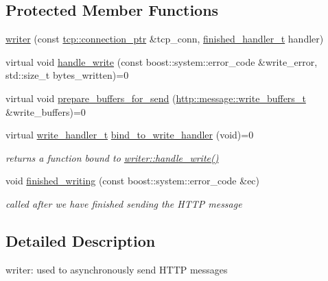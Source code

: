 \subsection*{Protected Member Functions}
\begin{DoxyCompactItemize}
\item 
\hyperlink{classpion_1_1http_1_1writer_abfa160a7e4fbbe09db12ab5c68d886ae}{writer} (const \hyperlink{namespacepion_1_1tcp_a6c9b7497068009f6d81d95ec0b0627d6}{tcp\-::connection\-\_\-ptr} \&tcp\-\_\-conn, \hyperlink{classpion_1_1http_1_1writer_a7e3ce4b88e0427adf673a99fca3af982}{finished\-\_\-handler\-\_\-t} handler)
\item 
virtual void \hyperlink{classpion_1_1http_1_1writer_a8bf871122153a6048ca5b21cacf5310c}{handle\-\_\-write} (const boost\-::system\-::error\-\_\-code \&write\-\_\-error, std\-::size\-\_\-t bytes\-\_\-written)=0
\item 
virtual void \hyperlink{classpion_1_1http_1_1writer_ab7a583948d97402772dc1fe2e87bcf66}{prepare\-\_\-buffers\-\_\-for\-\_\-send} (\hyperlink{classpion_1_1http_1_1message_aacf9a6a7677c32e4ab764ac97d0b5e7b}{http\-::message\-::write\-\_\-buffers\-\_\-t} \&write\-\_\-buffers)=0
\item 
virtual \hyperlink{classpion_1_1http_1_1writer_a36fa31c850362d907559a0c1157a1bf3}{write\-\_\-handler\-\_\-t} \hyperlink{classpion_1_1http_1_1writer_acea77b1d3cd2af31f4f1f410900aa207}{bind\-\_\-to\-\_\-write\-\_\-handler} (void)=0
\begin{DoxyCompactList}\small\item\em returns a function bound to \hyperlink{classpion_1_1http_1_1writer_a8bf871122153a6048ca5b21cacf5310c}{writer\-::handle\-\_\-write()} \end{DoxyCompactList}\item 
void \hyperlink{classpion_1_1http_1_1writer_a28a73762ddc3c59091aa44d10adad5ea}{finished\-\_\-writing} (const boost\-::system\-::error\-\_\-code \&ec)
\begin{DoxyCompactList}\small\item\em called after we have finished sending the H\-T\-T\-P message \end{DoxyCompactList}\end{DoxyCompactItemize}


\subsection{Detailed Description}
writer\-: used to asynchronously send H\-T\-T\-P messages 

